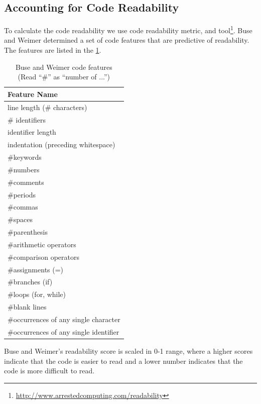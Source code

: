 \documentclass[12pt,mscthesis]{usiinfthesis}
\begin{document}
\subsection{Accounting for Code Readability}

	To calculate the code readability we use \citet{Buse:2010:LMC:1850489.1850615} code readability metric, and tool\footnote{\url{http://www.arrestedcomputing.com/readability}}.
	 Buse and Weimer determined a set of code features that are predictive of readability. The features are listed in the \cref{tab:Buse and Weimer}.

	\begin {table}[H]
	\begin{center}
    \begin{tabular}{ | l | }
    \hline
    \textbf{Feature Name}\\ \hline
	line length (\# characters)\\ \hline
 	\# identifiers\\ \hline
 	identifier length\\ \hline
	indentation (preceding whitespace)\\ \hline
	\#keywords\\ \hline
	 \#numbers\\ \hline
	\#comments\\ \hline
	\#periods\\ \hline
	\#commas\\ \hline
	\#spaces\\ \hline
	\#parenthesis\\ \hline
	 \#arithmetic operators\\ \hline
	 \#comparison operators\\ \hline
	 \#assignments (=)\\ \hline
	 \#branches (if)\\ \hline
	 \#loops (for, while)\\ \hline
	 \#blank lines\\ \hline
	 \#occurrences of any single character\\ \hline
	 \#occurrences of any single identifier\\ \hline
    \end{tabular}
	\end{center}
		\caption{Buse and Weimer code features \\ (Read “\#” as “number of ...”)} \label{tab:Buse and Weimer} 
	\end{table}

	Buse and Weimer's readability score is scaled in 0-1 range, where a higher scores indicate that the code is easier to read and a lower number indicates that the code is more difficult to read.
\end{document}
